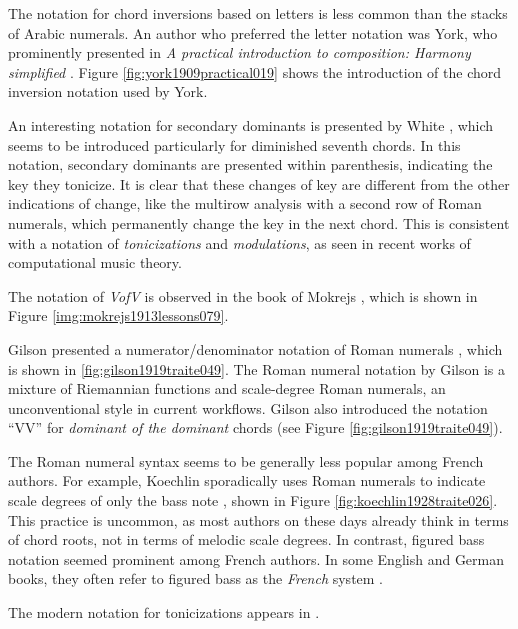 The notation for chord inversions based on letters is less common than the stacks of Arabic numerals.
An author who preferred the letter notation was York, who prominently presented in \emph{A practical introduction to composition: Harmony simplified} \textcite{york1909practical}.
Figure \ref{fig:york1909practical019} shows the introduction of the chord inversion notation used by York.

An interesting notation for secondary dominants is presented by White \textcite{white1911harmonic}, which seems to be introduced particularly for diminished seventh chords.
In this notation, secondary dominants are presented within parenthesis, indicating the key they tonicize.
It is clear that these changes of key are different from the other indications of change, like the multirow analysis with a second row of Roman numerals, which permanently change the key in the next chord.
This is consistent with a notation of \emph{tonicizations} and \emph{modulations}, as seen in recent works of computational music theory.

The notation of \emph{VofV} is observed in the book of Mokrejs \textcite{mokrejs1913lessons}, which is shown in Figure \ref{img:mokrejs1913lessons079}.

Gilson presented a numerator/denominator notation of Roman numerals \textcite{gilson1919traite}, which is shown in \ref{fig:gilson1919traite049}.
The Roman numeral notation by Gilson is a mixture of Riemannian functions and scale-degree Roman numerals, an unconventional style in current workflows.
Gilson also introduced the notation ``VV'' for \emph{dominant of the dominant} chords (see Figure \ref{fig:gilson1919traite049}).

The Roman numeral syntax seems to be generally less popular among French authors.
For example, Koechlin sporadically uses Roman numerals to indicate scale degrees of only the bass note \textcite{koechlin1928traite}, shown in Figure \ref{fig:koechlin1928traite026}.
This practice is uncommon, as most authors on these days already think in terms of chord roots, not in terms of melodic scale degrees.
In contrast, figured bass notation seemed prominent among French authors.
In some English and German books, they often refer to figured bass as the \emph{French} system .


The modern notation for tonicizations appears in \textcite{tischler1964practical}.

